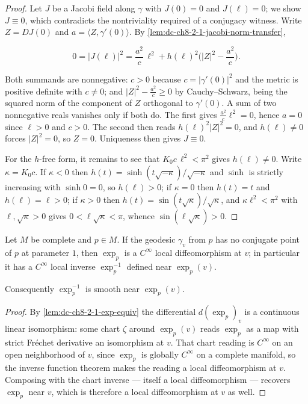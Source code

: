 \begin{proof}
  \leanok
\sketch
  Let $J$ be a Jacobi field along $\gamma$ with $J(0)=0$ and $J(\ell)=0$; we show $J\equiv0$,
  which contradicts the nontriviality required of a conjugacy witness. Write $Z=DJ(0)$ and
  $a=\langle Z,\gamma'(0)\rangle$. By \cref{lem:dc-ch8-2-1-jacobi-norm-transfer},

  $$
  0=|J(\ell)|^2=\frac{a^2}{c}\,\ell^2+h(\ell)^2\Big(|Z|^2-\frac{a^2}{c}\Big).
  $$

  Both summands are nonnegative: $c>0$ because $c=|\gamma'(0)|^2$ and the metric is positive
  definite with $c\neq0$; and $|Z|^2-\frac{a^2}{c}\geq0$ by Cauchy--Schwarz, being the squared
  norm of the component of $Z$ orthogonal to $\gamma'(0)$. A sum of two nonnegative reals
  vanishes only if both do. The first gives $\frac{a^2}{c}\ell^2=0$, hence $a=0$ since
  $\ell>0$ and $c>0$. The second then reads $h(\ell)^2|Z|^2=0$, and $h(\ell)\neq0$ forces
  $|Z|^2=0$, so $Z=0$. Uniqueness then gives $J\equiv0$.

  For the $h$-free form, it remains to see that $K_0c\,\ell^2<\pi^2$ gives $h(\ell)\neq0$.
  Write $\kappa=K_0c$. If $\kappa<0$ then $h(t)=\sinh(t\sqrt{-\kappa})/\sqrt{-\kappa}$ and
  $\sinh$ is strictly increasing with $\sinh 0=0$, so $h(\ell)>0$; if $\kappa=0$ then
  $h(t)=t$ and $h(\ell)=\ell>0$; if $\kappa>0$ then $h(t)=\sin(t\sqrt\kappa)/\sqrt\kappa$, and
  $\kappa\ell^2<\pi^2$ with $\ell,\sqrt\kappa>0$ gives $0<\ell\sqrt\kappa<\pi$, whence
  $\sin(\ell\sqrt\kappa)>0$.
\end{proof}

\begin{lemma}
  \label{lem:dc-ch8-2-1-exp-local-diffeo}
  \leanok
  Let $M$ be complete and $p\in M$. If the geodesic $\gamma_v$ from $p$ has no conjugate point
  of $p$ at parameter $1$, then $\exp_p$ is a $C^\infty$ local diffeomorphism at $v$; in
  particular it has a $C^\infty$ local inverse $\exp_p^{-1}$ defined near $\exp_p(v)$.

  Consequently $\exp_p^{-1}$ is smooth near $\exp_p(v)$.
\end{lemma}
\begin{proof}
  \leanok
\sketch
  By \cref{lem:dc-ch8-2-1-exp-equiv} the differential $d(\exp_p)_v$ is a continuous linear
  isomorphism: some chart $\zeta$ around $\exp_p(v)$ reads $\exp_p$ as a map with strict
  Fréchet derivative an isomorphism at $v$. That chart reading is $C^\infty$ on an open
  neighborhood of $v$, since $\exp_p$ is globally $C^\infty$ on a complete manifold, so the
  inverse function theorem makes the reading a local diffeomorphism at $v$. Composing with the
  chart inverse --- itself a local diffeomorphism --- recovers $\exp_p$ near $v$, which is
  therefore a local diffeomorphism at $v$ as well.
\end{proof}

